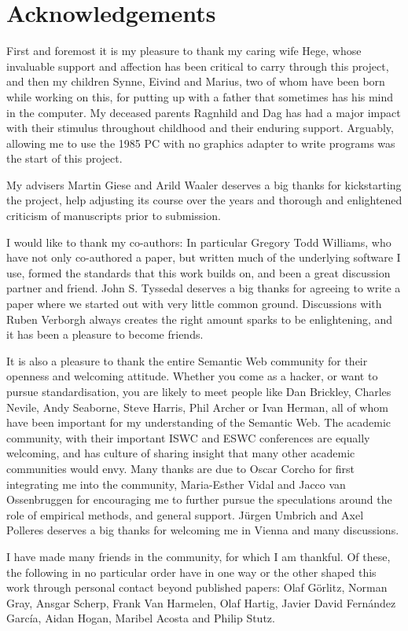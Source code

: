 \section*{Acknowledgements}

First and foremost it is my pleasure to thank my caring wife Hege,
whose invaluable support and affection has been critical to carry
through this project, and then my children Synne, Eivind and Marius,
two of whom have been born while working on this, for putting up with
a father that sometimes has his mind in the computer. My deceased
parents Ragnhild and Dag has had a major impact with their stimulus
throughout childhood and their enduring support. Arguably, allowing me
to use the 1985 PC with no graphics adapter to write programs was the
start of this project.

My advisers Martin Giese and Arild Waaler deserves a big thanks for
kickstarting the project, help adjusting its course over the years and
thorough and enlightened criticism of manuscripts prior to submission.

I would like to thank my co-authors: In particular Gregory Todd
Williams, who have not only co-authored a paper, but written much of
the underlying software I use, formed the standards that this work
builds on, and been a great discussion partner and friend. John
S. Tyssedal deserves a big thanks for agreeing to write a paper where
we started out with very little common ground. Discussions with Ruben
Verborgh always creates the right amount sparks to be enlightening,
and it has been a pleasure to become friends.

It is also a pleasure to thank the entire Semantic Web community for
their openness and welcoming attitude. Whether you come as a hacker,
or want to pursue standardisation, you are likely to meet people like
Dan Brickley, Charles Nevile, Andy Seaborne, Steve Harris, Phil Archer
or Ivan Herman, all of whom have been important for my understanding
of the Semantic Web. The academic community, with their important ISWC
and ESWC conferences are equally welcoming, and has culture of sharing
insight that many other academic communities would envy. Many thanks
are due to Oscar Corcho for first integrating me into the community,
Maria-Esther Vidal and Jacco van Ossenbruggen for encouraging me to
further pursue the speculations around the role of empirical methods,
and general support. Jürgen Umbrich and Axel Polleres deserves a big
thanks for welcoming me in Vienna and many discussions.

I have made many friends in the community, for which I am thankful. Of
these, the following in no particular order have in one way or the
other shaped this work through personal contact beyond published
papers: Olaf Görlitz, Norman Gray, Ansgar Scherp, Frank Van Harmelen,
Olaf Hartig, Javier David Fernández García, Aidan Hogan, Maribel
Acosta and Philip Stutz.

